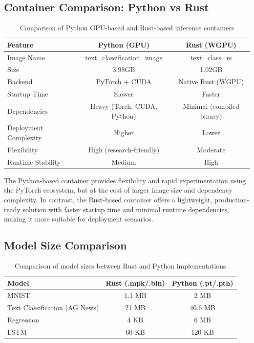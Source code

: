 \documentclass[10pt,a4paper,twocolumn]{article}
\begin{document}
\subsection{Container Comparison: Python vs Rust}

\begin{table}[t!]
\centering
\begin{tabular}{|l|c|c|}
\hline
\textbf{Feature} & \textbf{Python (GPU)} & \textbf{Rust (WGPU)} \\
\hline
Image Name & text\_classification\_image & text\_class\_rs \\
\hline
Size &  3.98GB &  1.02GB \\
\hline
Backend & PyTorch + CUDA & Native Rust (WGPU) \\
\hline
Startup Time & Slower & Faster \\
\hline
Dependencies & Heavy (Torch, CUDA, Python) & Minimal (compiled binary) \\
\hline
Deployment Complexity & Higher & Lower \\
\hline
Flexibility & High (research-friendly) & Moderate \\
\hline
Runtime Stability & Medium & High \\
\hline
\end{tabular}
\caption{Comparison of Python GPU-based and Rust-based inference containers}
\end{table}

\noindent
The Python-based container provides flexibility and rapid experimentation using the PyTorch ecosystem, but at the cost of larger image size and dependency complexity. In contrast, the Rust-based container offers a lightweight, production-ready solution with faster startup time and minimal runtime dependencies, making it more suitable for deployment scenarios.

\subsection{Model Size Comparison}

\begin{table}[t!]
\centering
\begin{tabular}{|l|c|c|}
\hline
\textbf{Model} & \textbf{Rust (.mpk/.bin)} & \textbf{Python (.pt/.pth)} \\
\hline
MNIST & 1.1 MB & 2 MB \\
\hline
Text Classification (AG News) & 21 MB & 40.6 MB \\
\hline
Regression & 4 KB & 6 MB \\
\hline
LSTM & 60 KB & 120 KB \\
\hline
\end{tabular}
\caption{Comparison of model sizes between Rust and Python implementations}
\end{table}
\end{document}
